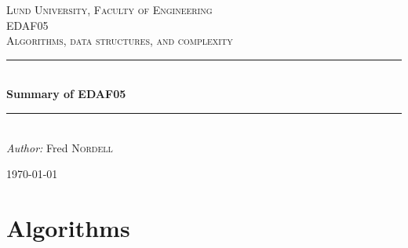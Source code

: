 \documentclass[12pt]{article} %
\begin{document}

\begin{titlepage}

\newcommand{\HRule}{\rule{\linewidth}{0.5mm}} %

\center %

\textsc{\LARGE Lund University, Faculty of Engineering}\\[1.5cm] %
\textsc{\Large EDAF05}\\[0.5cm] %
\textsc{\large Algorithms, data structures, and complexity}\\[0.5cm] %

\HRule \\[1cm]
{ \huge \bfseries Summary of EDAF05}\\[0.4cm] %
\HRule \\[1.5cm]

\emph{Author:} Fred \textsc{Nordell} %

{\large \today}\\[3cm] %


\vfill %

\end{titlepage}


\tableofcontents %
\lstlistoflistings %
\listoffigures %
\listoftables

\newpage %


\section{Algorithms} %
\end{document}

